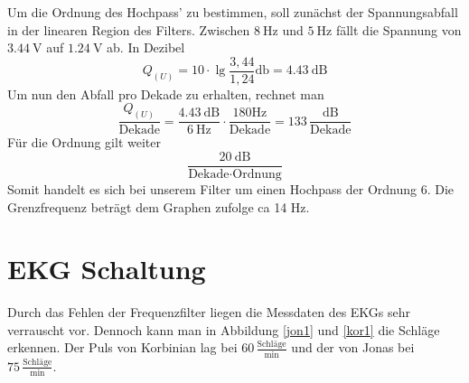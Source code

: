 Um die Ordnung des Hochpass' zu bestimmen, soll zunächst der Spannungsabfall in
der linearen Region des Filters. Zwischen $\SI{8}{\hertz}$ und $\SI{5}{\hertz}$
fällt die Spannung von $\SI{3,44}{\volt}$ auf $\SI{1,24}{\volt}$ ab. In
Dezibel
\[
Q_{(U)} = 10 \cdot \lg \frac{3,44}{1,24} \si{\decibel} = \SI{4,43}{\dB}
\]
Um nun den Abfall pro Dekade zu erhalten, rechnet man
\[
\frac{Q_{(U)} }{\text{Dekade}} = \frac{ \SI{4,43}{\dB} }{ \SI{6}
{\Hz}} \cdot \frac{ 180 \text{Hz} }{\text{Dekade}} = 133 \, \frac{
\si{\dB}}{\text{Dekade}}
\]
Für die Ordnung gilt weiter
\[
\frac{ \SI{20}{\dB} }{\text{Dekade} \cdot \text{Ordnung} }
\]
Somit handelt es sich bei unserem Filter um einen Hochpass der Ordnung 6.
Die Grenzfrequenz beträgt dem Graphen zufolge ca 14 Hz. 

\section{EKG Schaltung}

Durch das Fehlen der Frequenzfilter liegen die Messdaten des EKGs sehr
verrauscht vor. Dennoch kann man in Abbildung \ref{jon1} und \ref{kor1} die
Schläge erkennen. 
Der Puls von Korbinian lag bei $60 \, \frac{ \text{Schläge}}{\text{min}}$ und der von
Jonas bei $75 \, \frac{\text{Schläge}}{\text{min}}$.
